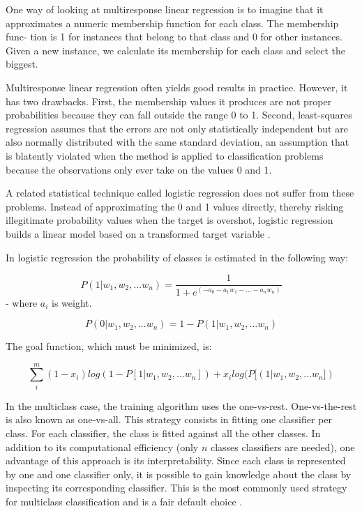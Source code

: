 \documentclass[12pt]{report}
\begin{document}
One way of looking at multiresponse linear regression is to imagine that it approximates a numeric membership function for each class. The membership func- tion is 1 for instances that belong to that class and 0 for other instances. Given a new instance, we calculate its membership for each class and select the biggest.

Multiresponse linear regression often yields good results in practice. However, it has two drawbacks. First, the membership values it produces are not proper probabilities because they can fall outside the range 0 to 1. Second, least-squares regression assumes that the errors are not only statistically independent but are also normally distributed with the same standard deviation, an assumption that is blatently violated when the method is applied to classification problems because the observations only ever take on the values 0 and 1.

A related statistical technique called logistic regression does not suffer from these problems. Instead of approximating the 0 and 1 values directly, thereby risking illegitimate probability values when the target is overshot, logistic regression builds a linear model based on a transformed target variable \cite{Witten and Frank}.

In logistic regression the probability of classes is estimated in the following way:

$$P(1 | w_1, w_2, ... w_n) = \dfrac{1}{1 + e^(-a_0 - a_1 w_1 - ... - a_n w_n)}$$
- where $a_i$ is weight.

$$P(0 | w_1, w_2, ... w_n) = 1 - P(1 | w_1, w_2, ... w_n)$$

The goal function, which must be minimized, is:

$$\sum_{i}^{m} {(1 - x_i) log(1 - P[1 | w_1, w_2, ... w_n]) + x_i log(P[(1 | w_1, w_2, ... w_n])}$$

In the multiclass case, the training algorithm uses the one-vs-rest. One-vs-the-rest is also known as one-vs-all. This strategy consists in fitting one classifier per class. For each classifier, the class is fitted against all the other classes. In addition to its computational efficiency (only $n$ classes classifiers are needed), one advantage of this approach is its interpretability. Since each class is represented by one and one classifier only, it is possible to gain knowledge about the class by inspecting its corresponding classifier. This is the most commonly used strategy for multiclass classification and is a fair default choice \cite{McKinney}.
\end{document}

